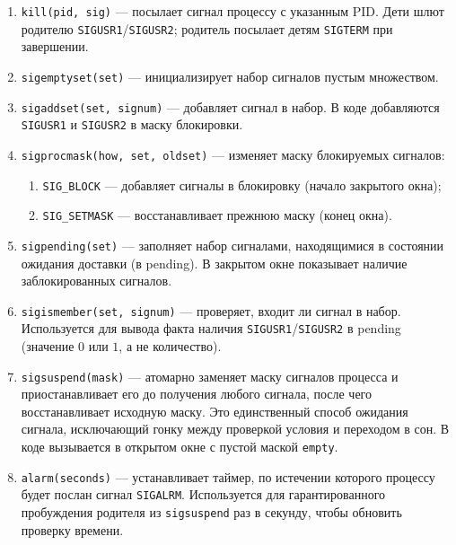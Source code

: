 \begin{enumerate}
\begin{enumerate}
            \item \texttt{kill(pid, sig)} — посылает сигнал процессу с указанным PID. Дети шлют родителю \texttt{SIGUSR1}/\texttt{SIGUSR2}; родитель посылает детям \texttt{SIGTERM} при завершении.

            \item \texttt{sigemptyset(set)} — инициализирует набор сигналов пустым множеством.

            \item \texttt{sigaddset(set, signum)} — добавляет сигнал в набор. В коде добавляются \texttt{SIGUSR1} и \texttt{SIGUSR2} в маску блокировки.

            \item \texttt{sigprocmask(how, set, oldset)} — изменяет маску блокируемых сигналов:
            \begin{enumerate}
                \item \texttt{SIG\_BLOCK} — добавляет сигналы в блокировку (начало закрытого окна);
                \item \texttt{SIG\_SETMASK} — восстанавливает прежнюю маску (конец окна).
            \end{enumerate}

            \item \texttt{sigpending(set)} — заполняет набор сигналами, находящимися в состоянии ожидания доставки (в pending). В закрытом окне показывает наличие заблокированных сигналов.

            \item \texttt{sigismember(set, signum)} — проверяет, входит ли сигнал в набор. Используется для вывода факта наличия \texttt{SIGUSR1}/\texttt{SIGUSR2} в pending (значение $0$ или $1$, а не количество).

            \item \texttt{sigsuspend(mask)} — атомарно заменяет маску сигналов процесса и приостанавливает его до получения любого сигнала, после чего восстанавливает исходную маску. Это единственный способ ожидания сигнала, исключающий гонку между проверкой условия и переходом в сон. В коде вызывается в открытом окне с пустой маской \texttt{empty}.

            \item \texttt{alarm(seconds)} — устанавливает таймер, по истечении которого процессу будет послан сигнал \texttt{SIGALRM}. Используется для гарантированного пробуждения родителя из \texttt{sigsuspend} раз в секунду, чтобы обновить проверку времени.
        \end{enumerate}


\end{enumerate}

